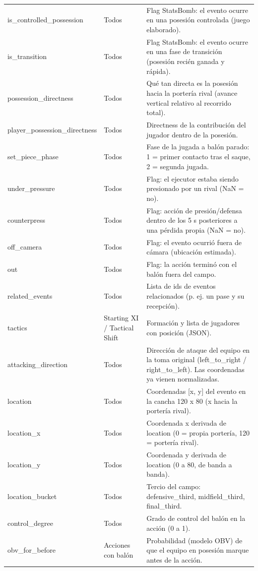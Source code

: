 {\begin{longtable}{p{4.3cm}p{2.2cm}p{8.8cm}}
is\_controlled\_possession & Todos & Flag StatsBomb: el evento ocurre en una posesión controlada (juego elaborado). \\
is\_transition & Todos & Flag StatsBomb: el evento ocurre en una fase de transición (posesión recién ganada y rápida). \\
possession\_directness & Todos & Qué tan directa es la posesión hacia la portería rival (avance vertical relativo al recorrido total). \\
player\_possession\_directness & Todos & Directness de la contribución del jugador dentro de la posesión. \\
set\_piece\_phase & Todos & Fase de la jugada a balón parado: 1 = primer contacto tras el saque, 2 = segunda jugada. \\
under\_pressure & Todos & Flag: el ejecutor estaba siendo presionado por un rival (NaN = no). \\
counterpress & Todos & Flag: acción de presión/defensa dentro de los 5 s posteriores a una pérdida propia (NaN = no). \\
off\_camera & Todos & Flag: el evento ocurrió fuera de cámara (ubicación estimada). \\
out & Todos & Flag: la acción terminó con el balón fuera del campo. \\
related\_events & Todos & Lista de ids de eventos relacionados (p. ej. un pase y su recepción). \\
tactics & Starting XI / Tactical Shift & Formación y lista de jugadores con posición (JSON). \\
attacking\_direction & Todos & Dirección de ataque del equipo en la toma original (left\_to\_right / right\_to\_left). Las coordenadas ya vienen normalizadas. \\
location & Todos & Coordenadas [x, y] del evento en la cancha 120 x 80 (x hacia la portería rival). \\
location\_x & Todos & Coordenada x derivada de location (0 = propia portería, 120 = portería rival). \\
location\_y & Todos & Coordenada y derivada de location (0 a 80, de banda a banda). \\
location\_bucket & Todos & Tercio del campo: defensive\_third, midfield\_third, final\_third. \\
control\_degree & Todos & Grado de control del balón en la acción (0 a 1). \\
obv\_for\_before & Acciones con balón & Probabilidad (modelo OBV) de que el equipo en posesión marque antes de la acción. \\

\end{longtable}}

